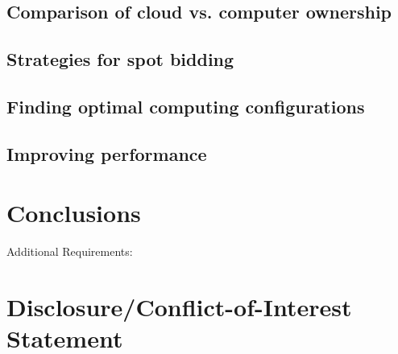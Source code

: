 \documentclass{frontiersSCNS} %
\begin{document}
\subsection{Comparison of cloud vs. computer ownership}

\subsection{Strategies for spot bidding}

\subsection{Finding optimal computing configurations}

\subsection{Improving performance}

\section{Conclusions}

Additional Requirements:

\section*{Disclosure/Conflict-of-Interest Statement}
\end{document}
